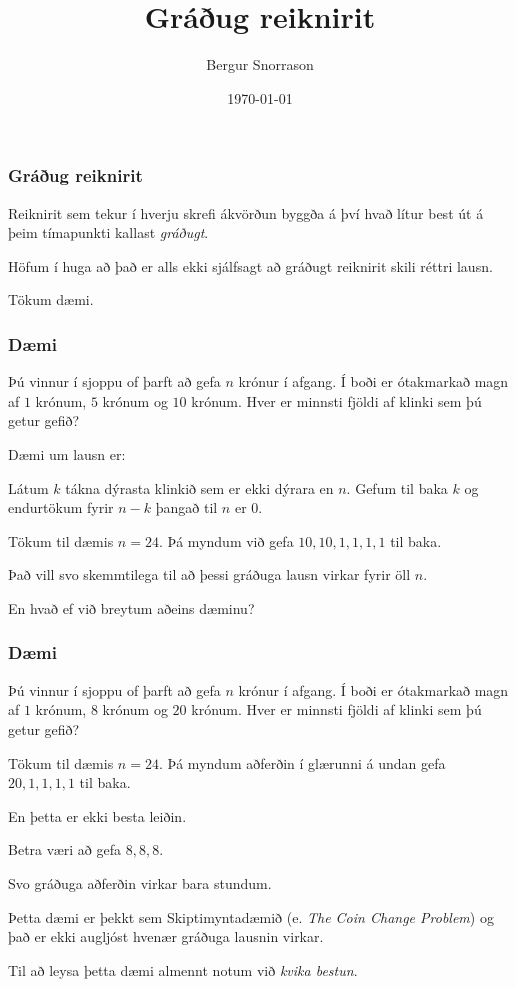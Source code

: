 \title{Gráðug reiknirit}
\author{Bergur Snorrason}
\date{\today}



\frame{\titlepage}

{
	\frametitle{Gráðug reiknirit}
	{
		\item<1-> Reiknirit sem tekur í hverju skrefi ákvörðun byggða á því hvað lítur best út á þeim tímapunkti kallast \emph{gráðugt}.
		\item<2-> Höfum í huga að það er alls ekki sjálfsagt að gráðugt reiknirit skili réttri lausn.
		\item<3-> Tökum dæmi.
	}
}

{
	\frametitle{Dæmi}
	{
		\item<1-> 
			Þú vinnur í sjoppu of þarft að gefa $n$ krónur í afgang. 
			Í boði er ótakmarkað magn af $1$ krónum, $5$ krónum og $10$ krónum.
			Hver er minnsti fjöldi af klinki sem þú getur gefið?
		\item<2-> Dæmi um lausn er:
		\item<3-> Látum $k$ tákna dýrasta klinkið sem er ekki dýrara en $n$. Gefum til baka $k$ og endurtökum fyrir $n - k$ þangað til $n$ er $0$.
		\item<4-> Tökum til dæmis $n = 24$. Þá myndum við gefa $10, 10, 1, 1, 1, 1$ til baka.
		\item<5-> Það vill svo skemmtilega til að þessi gráðuga lausn virkar fyrir öll $n$.
		\item<6-> En hvað ef við breytum aðeins dæminu?
	}
}

{
	\frametitle{Dæmi}
	{
		\item<1-> 
			Þú vinnur í sjoppu of þarft að gefa $n$ krónur í afgang. 
			Í boði er ótakmarkað magn af $1$ krónum, $8$ krónum og $20$ krónum.
			Hver er minnsti fjöldi af klinki sem þú getur gefið?
		\item<2-> Tökum til dæmis $n = 24$. Þá myndum aðferðin í glærunni á undan gefa $20, 1, 1, 1, 1$ til baka.
		\item<3-> En þetta er ekki besta leiðin.
		\item<4-> Betra væri að gefa $8, 8, 8$.
		\item<5-> Svo gráðuga aðferðin virkar bara stundum.
		\item<6-> Þetta dæmi er þekkt sem Skiptimyntadæmið (e. \emph{The Coin Change Problem}) og það er ekki augljóst hvenær gráðuga lausnin virkar.
		\item<7-> Til að leysa þetta dæmi almennt notum við \emph{kvika bestun}.
	}
}


